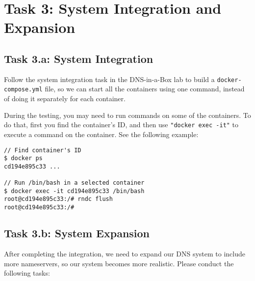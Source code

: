 \section{Task 3: System Integration and Expansion}



\subsection{Task 3.a: System Integration}



Follow the system integration task in the DNS-in-a-Box lab to 
build a \texttt{docker-compose.yml} file, so we can
start all the containers using one command, instead of doing 
it separately for each container. 


During the testing, you may need to run commands on some of the containers.
To do that, first you find the container's ID, and then use
\texttt{"docker exec -it"} to execute a command on the container. See
the following example:

\begin{lstlisting}
// Find container's ID
$ docker ps
cd194e895c33 ...

// Run /bin/bash in a selected container
$ docker exec -it cd194e895c33 /bin/bash
root@cd194e895c33:/# rndc flush
root@cd194e895c33:/#
\end{lstlisting}




\subsection{Task 3.b: System Expansion}


After completing the integration, we need to expand our
DNS system to include more nameservers, so our system becomes more 
realistic. Please conduct the following tasks:

